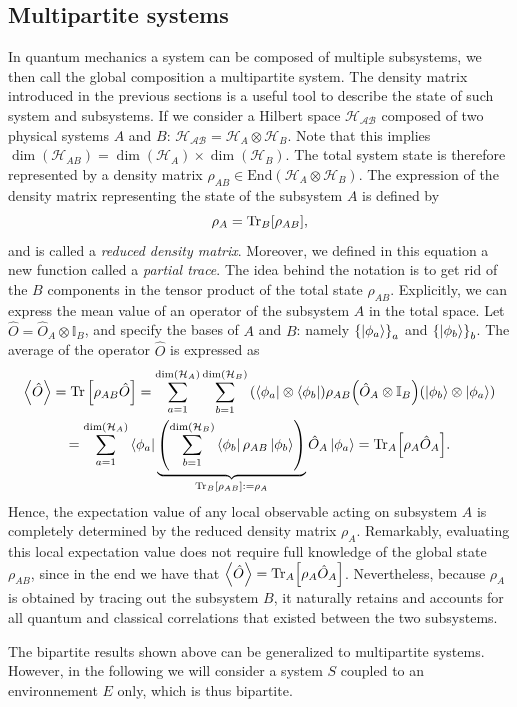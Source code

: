 \subsection{Multipartite systems}\label{sec:multipartite}
In quantum mechanics a system can be composed of multiple subsystems, we then call the global composition a multipartite system. The density matrix introduced in the previous sections is a useful tool to describe the state of such system and subsystems. If we consider a Hilbert space $\mathcal{H_{AB}}$ composed of two physical systems $A$ and $B$: $\mathcal{H_{AB}}=\mathcal{H}_A\otimes\mathcal{H}_B$. Note that this implies $\dim(\mathcal{H}_{AB})=\dim(\mathcal{H}_A)\times\dim(\mathcal{H}_B)$. The total system state is therefore represented by a density matrix $\rho_{AB}\in\mathrm{End}(\mathcal{H}_A\otimes\mathcal{H}_B)$. The expression of the density matrix representing the state of the subsystem $A$ is defined by
\begin{equation}
    \rho_A = \mathrm{Tr}_B\qty[\rho_{AB}],
\end{equation}
and is called a \textit{reduced density matrix}. Moreover, we defined in this equation a new function called a \textit{partial trace}. The idea behind the notation is to get rid of the $B$ components in the tensor product of the total state $\rho_{AB}$. Explicitly, we can express the mean value of an operator of the subsystem $A$  in the total space. Let $\hat{O}=\hat{O}_A\otimes\mathbb{I}_B$, and specify the bases of $A$ and $B$: namely $\qty{\ket{\phi_a}}_a$ and $\qty{\ket{\phi_b}}_b$. The average of the operator $\hat{O}$ is expressed as
\begin{multline}
    \expval{\hat{O}} = \operatorname{Tr}\left[\rho_{AB}\hat{O}\right] = \sum_{a=1}^{\dim(\mathcal{H}_A)}\sum_{b=1}^{\dim(\mathcal{H}_B)}\qty(\bra{\phi_a}\otimes\bra{\phi_b})\rho_{AB}\qty(\hat{O}_A\otimes\mathbb{I}_B)\qty(\ket{\phi_b}\otimes\ket{\phi_a})\\
    = \sum_{a=1}^{\dim(\mathcal{H}_A)}\bra{\phi_a}\underbrace{\qty(\sum_{b=1}^{\dim(\mathcal{H}_B)}\bra{\phi_b}\rho_{AB}\ket{\phi_b})}_{\mathrm{Tr}_B\qty[\rho_{AB}]:=\rho_A}\hat{O}_A\ket{\phi_a} = \mathrm{Tr}_A\qty[\rho_A \hat{O}_A].
\end{multline}
Hence, the expectation value of any local observable acting on subsystem $A$ is completely determined by the reduced density matrix $\rho_A$. Remarkably, evaluating this local expectation value does not require full knowledge of the global state $\rho_{AB}$, since in the end we have that $\expval{\hat{O}}=\mathrm{Tr}_A\qty[\rho_A \hat{O}_A]$. Nevertheless, because $\rho_A$ is obtained by tracing out the subsystem $B$, it naturally retains and accounts for all quantum and classical correlations that existed between the two subsystems.

The bipartite results shown above can be generalized to multipartite systems. However, in the following we will consider a system $S$ coupled to an environnement $E$ only, which is thus bipartite. 